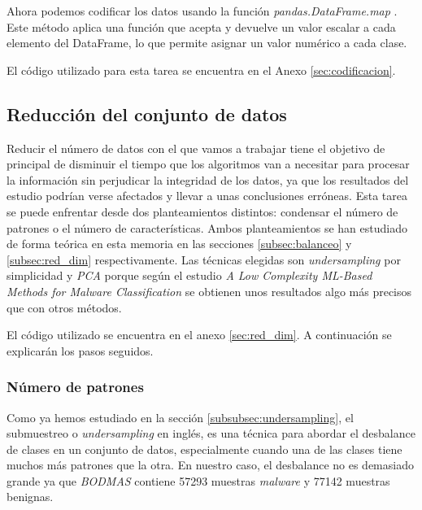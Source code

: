 \vspace{1em}

Ahora podemos codificar los datos usando la función \textit{pandas.DataFrame.map} \cite{map}. Este método aplica una función que acepta y devuelve un valor escalar a cada elemento del DataFrame, lo que permite asignar un valor numérico a cada clase.

\vspace{1em}

El código utilizado para esta tarea se encuentra en el Anexo \ref{sec:codificacion}.

\subsection{Reducción del conjunto de datos}
\label{subsec:red_dataset}

Reducir el número de datos con el que vamos a trabajar tiene el objetivo de principal de disminuir el tiempo que los algoritmos van a necesitar para procesar la información sin perjudicar la integridad de los datos, ya que los resultados del estudio podrían verse afectados y llevar a unas conclusiones erróneas. Esta tarea se puede enfrentar desde dos planteamientos distintos: condensar el número de patrones o el número de características. Ambos planteamientos se han estudiado de forma teórica en esta memoria en las secciones \ref{subsec:balanceo} y \ref{subsec:red_dim} respectivamente. Las técnicas elegidas son \textit{undersampling} por simplicidad y \textit{PCA} porque según el estudio \textit{A Low Complexity ML-Based Methods for Malware Classification} \cite{red_dim_pca} se obtienen unos resultados algo más precisos que con otros métodos.

\vspace{1em}

El código utilizado se encuentra en el anexo \ref{sec:red_dim}. A continuación se explicarán los pasos seguidos.

\subsubsection{Número de patrones}
\label{subsubsec:num_patrones}

Como ya hemos estudiado en la sección \ref{subsubsec:undersampling}, el submuestreo o \textit{undersampling} en inglés, es una técnica para abordar el desbalance de clases en un conjunto de datos, especialmente cuando una de las clases tiene muchos más patrones que la otra. En nuestro caso, el desbalance no es demasiado grande ya que \textit{BODMAS} contiene 57293 muestras \textit{malware} y 77142 muestras benignas.

